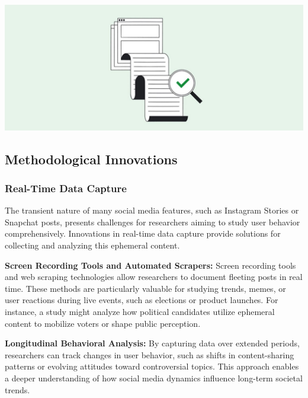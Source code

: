 \documentclass[
]{book}
\begin{document}
\href{https://newsinitiative.withgoogle.com/resources/trainings/verification/google-fact-check-tools/}{\includegraphics[width=1\linewidth,height=\textheight,keepaspectratio]{images/factcheck.jpg}}

\subsection*{Methodological Innovations}\label{methodological-innovations}

\subsubsection*{Real-Time Data Capture}\label{real-time-data-capture}

The transient nature of many social media features, such as Instagram Stories or Snapchat posts, presents challenges for researchers aiming to study user behavior comprehensively. Innovations in real-time data capture provide solutions for collecting and analyzing this ephemeral content.

\textbf{Screen Recording Tools and Automated Scrapers:} Screen recording tools and web scraping technologies allow researchers to document fleeting posts in real time. These methods are particularly valuable for studying trends, memes, or user reactions during live events, such as elections or product launches. For instance, a study might analyze how political candidates utilize ephemeral content to mobilize voters or shape public perception.

\textbf{Longitudinal Behavioral Analysis:} By capturing data over extended periods, researchers can track changes in user behavior, such as shifts in content-sharing patterns or evolving attitudes toward controversial topics. This approach enables a deeper understanding of how social media dynamics influence long-term societal trends.
\end{document}

